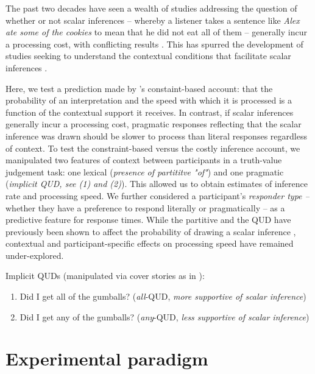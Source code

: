 \documentclass[10pt,letterpaper]{article}
\begin{document}
The past two decades have seen a wealth of studies addressing the question of whether or not scalar inferences -- whereby a listener takes a sentence like \textit{Alex ate some of the cookies} to mean that he did not eat all of them -- generally incur a processing cost, with conflicting results \cite{BottNoveck2004,HuangSnedeker2009,Grodner2010,Breheny2013,DegenTanenhaus2016}. This has spurred the development of studies seeking to understand the contextual conditions that facilitate scalar inferences \cite{Zondervan2010,Degen2015,Augurzky2019,MartyChemla2013,DegenGoodman2014}.

Here, we test a prediction made by 
's constaint-based account: that the probability of an interpretation and the speed with which it is processed is a function of the contextual support it receives. In contrast, if scalar inferences generally incur a processing cost, pragmatic responses reflecting that the scalar inference was drawn should be slower to process than literal responses regardless of context. To test the constraint-based versus the costly inference account, we manipulated two features of context between participants in a truth-value judgement task: one lexical (\textit{presence of partititve "of"}) and one pragmatic (\textit{implicit QUD, see (1) and (2)}). This allowed us to obtain estimates of inference rate and processing speed. We further considered a participant’s \textit{responder type  --} whether they have a preference to respond literally or pragmatically -- as a predictive feature for response times. While the partitive and the QUD have previously been shown to affect the probability of drawing a scalar inference \cite{Zondervan2010,Degen2015,DegenGoodman2014,DegenTanenhaus2015}, contextual and participant-specific effects on processing speed have remained under-explored.

Implicit QUDs (manipulated via cover stories as in ):
\begin{enumerate}
  \item Did I get all of the gumballs? (\textit{all}-QUD, \textit{more supportive of scalar inference})
  \item Did I get any of the gumballs? (\textit{any}-QUD, \textit{less supportive of scalar inference})
\end{enumerate} 

\section{Experimental paradigm}
\end{document}
